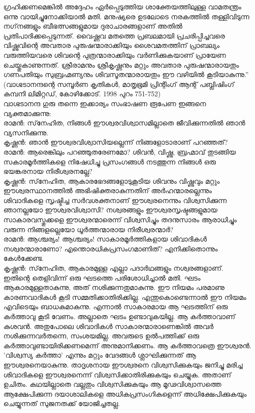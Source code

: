 ഗ്രഹിക്കണമെങ്കില്‍ അദ്ദേഹം ഏര്‍പ്പെടുത്തിയ ശാക്തേയത്തിലുള്ള വാമതന്ത്രം ഒന്നു വായിച്ചുനോക്കിയാല്‍ മതി. മനുഷ്യരെ ഉടലോടെ നരകത്തില്‍ തള്ളിവിടുന്ന നഗ്‌നങ്ങളും ബീഭത്സങ്ങളുമായ ദുരാചാരങ്ങളാണ് അതില്‍ പ്രതിപാദിക്കപ്പെടുന്നത്. വൈഷ്ണവ മതത്തെ പ്രബലമായി പ്രചരിപ്പിച്ചവരെ വിഷ്ണുവിന്റെ അവതാര പുരുഷന്മാരാക്കിയും ശൈവമതത്തിന് പ്രാബല്യം വരുത്തിയവരെ ശിവന്റെ പുത്രന്മാരാക്കിയും വര്‍ണിക്കുകയാണ് പ്രായേണ ചെയ്തുകാണുന്നത്. ശ്രീരാമനും ശ്രീകൃഷ്ണനും മറ്റും അവതാര പുരുഷന്മാരായതും ഗണപതിയും സുബ്രഹ്മണ്യനും ശിവസൂതന്മാരായതും ഈ വഴിയില്‍ കൂടിയാകുന്നു.'' (വാഗ്ഭടാനന്ദന്റെ സമ്പൂര്‍ണ കൃതികള്‍, മാതൃഭൂമി പ്രിന്റിംഗ് ആന്റ് പബ്ലിഷിംഗ് കമ്പനി ലിമിറ്റഡ്, കോഴിക്കോട്. 1998 പുറം 751-752)\\

വാഗ്ഭടാനന്ദ ഗുരു തന്നെ ഇക്കാര്യം സംഭാഷണ രൂപേണ ഇങ്ങനെ വ്യക്തമാക്കുന്നു:\\
രാമന്‍: സ്‌നേഹിത, നിങ്ങള്‍ ഈശ്വരവിശ്വാസമില്ലാതെ ജീവിക്കുന്നതില്‍ ഞാന്‍ വ്യസനിക്കുന്നു.\\
കൃഷ്ണന്‍: ഞാന്‍ ഈശ്വരവിശ്വാസിയല്ലെന്ന് നിങ്ങളോടാരാണ് പറഞ്ഞത്?\\
രാമന്‍: ആരെങ്കിലും പറഞ്ഞുതരേണമോ? ശിവന്‍, വിഷ്ണു, ബ്രഹ്മാവ് തുടങ്ങിയ സകാരമൂര്‍ത്തികളെ നിഷേധിച്ചു പ്രസംഗങ്ങള്‍ നടത്തുന്ന നിങ്ങള്‍ ഒരു ഭയങ്കരനായ നിരീശ്വരനല്ലേ?\\
കൃഷ്ണന്‍: സ്‌നേഹിത, ആകാരഭേദങ്ങളോടുകൂടിയ ശിവനും വിഷ്ണുവും മറ്റും ഈശ്വരസ്ഥാനത്തില്‍ അഭിഷിക്തരാകുന്നതിന് അര്‍ഹന്മാരല്ലെന്നും ശിവാദികളെ സൃഷ്ടിച്ച സര്‍വശക്തനാണ് ഈശ്വരനെന്നും വിശ്വസിക്കുന്ന ഞാനല്ലയോ ഈശ്വരവിശ്വാസി? നശ്വരങ്ങളും ഈശ്വരസൃഷ്ടങ്ങളുമായ സാകാരവസ്തുക്കളെ ഈശ്വരന്മാരെന്ന് വിശ്വസിച്ചും തദനുസാരം ആരാധിച്ചും വരുന്ന നിങ്ങളല്ലെയോ ധൂര്‍ത്തന്മാരായ നിരീശ്വരന്മാര്‍?\\
രാമന്‍: ആശ്ചര്യം! ആശ്ചര്യം! സാകാരമൂര്‍ത്തികളായ ശിവാദികള്‍ നശ്വരന്മാരാണോ? എന്തൊരധികപ്രസംഗമാണിത്? എനിക്കിതൊന്നും കേള്‍ക്കേണ്ട.\\
കൃഷ്ണന്‍: സ്‌നേഹിത, ആകാരമുള്ള എല്ലാ പദാര്‍ഥങ്ങളും നശ്വരങ്ങളാണ്. ഇതിന്റെ തെളിവിന്ന് ഒരു ഘടത്തെ പരിശോധിച്ചാല്‍ മതി. ഘടം ആകാരമുള്ളതാകുന്നു, അത് നശിക്കുന്നതുമാകുന്നു. ഈ നിയമം പരമാണു കാരണവാദികള്‍ കൂടി സമ്മതിക്കാതിരിക്കില്ല. എന്തുകൊണ്ടെന്നാല്‍ ഈ നിയമം എവിടെയും ബാധകമാകുന്നു. എന്നാല്‍ സാകാരമായ ആ ഘടത്തിന് ഒരു കര്‍ത്താവു കൂടി വേണം. അല്ലാതെ ഘടം ഉണ്ടാവുകയില്ല. ആ കര്‍ത്താവാണ് കുശവന്‍. അതുപോലെ ശിവാദികള്‍ സാകാരന്മാരാണെങ്കില്‍ അവര്‍ നശിക്കുന്നവര്‍തന്നെ, സംശയമില്ല. അവരുടെ ഉല്‍പത്തിക്ക് ഒരു കര്‍ത്താവുണ്ടായിരിക്കണമെന്ന് അനുമാനിക്കണം. ആ കര്‍ത്താവത്രെ ഈശ്വരന്‍. 'വിശ്വസ്യ കര്‍ത്താ' എന്നും മറ്റും വേദങ്ങള്‍ ശ്ലാഘിക്കുന്നത് ആ ഈശ്വരനെയാകുന്നു. താദൃശനായ ഈശ്വരനെ വിശ്വസിക്കുകയും ജനിച്ചു മരിച്ച ശിവാദികളെ ഈശ്വരനെന്ന് വിശ്വസിക്കാതിരിക്കുകയും ചെയ്യുക. അതാണ് ഉചിതം. കഥയില്ലാതെ വല്ലതും വിശ്വസിക്കുകയും ആ മൂഢവിശ്വാസത്തെ ആക്ഷേപിക്കുന്ന ദയാശാലികളെ അധികപ്രസംഗികളെന്ന് അധിക്ഷേപിക്കുകയും ചെയ്യുന്നത് സുജനതക്ക് യോജിച്ചതല്ല.\\
